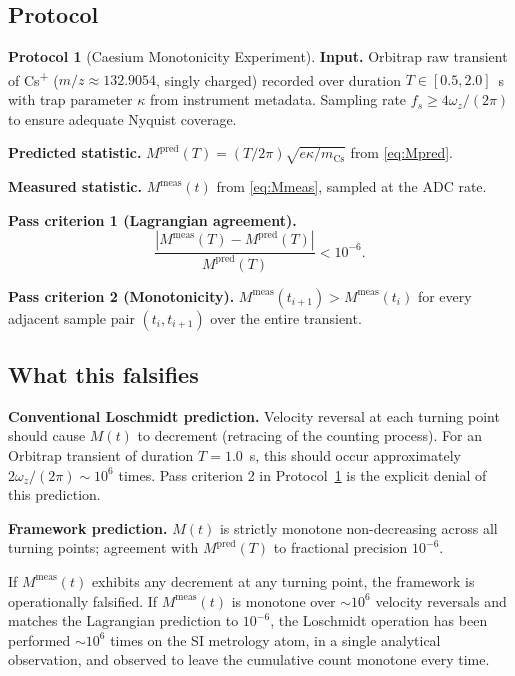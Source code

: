 \documentclass[twocolumn,10pt,a4paper]{article}
\theoremstyle{thmstyle}
\theoremstyle{definition}
\newtheorem{protocol}[theorem]{Protocol}
\theoremstyle{remark}
\begin{document}
\subsection{Protocol}

\begin{protocol}[Caesium Monotonicity Experiment]
\label{prot:C1}
\textbf{Input.} Orbitrap raw transient of Cs\textsuperscript{+}
($m/z\approx 132.9054$, singly charged) recorded over duration
$T\in[0.5,2.0]$~s with trap parameter $\kappa$ from instrument
metadata. Sampling rate $f_{s}\geq 4\omega_{z}/(2\pi)$ to ensure
adequate Nyquist coverage.

\textbf{Predicted statistic.}
$M^{\mathrm{pred}}(T)=(T/2\pi)\sqrt{e\kappa/m_{\mathrm{Cs}}}$ from
\eqref{eq:Mpred}.

\textbf{Measured statistic.} $M^{\mathrm{meas}}(t)$ from
\eqref{eq:Mmeas}, sampled at the ADC rate.

\textbf{Pass criterion 1 (Lagrangian agreement).}
\[
\frac{|M^{\mathrm{meas}}(T)-M^{\mathrm{pred}}(T)|}{M^{\mathrm{pred}}(T)}<10^{-6}.
\]

\textbf{Pass criterion 2 (Monotonicity).}
$M^{\mathrm{meas}}(t_{i+1})>M^{\mathrm{meas}}(t_{i})$ for every
adjacent sample pair $(t_{i},t_{i+1})$ over the entire transient.
\end{protocol}

\subsection{What this falsifies}

\textbf{Conventional Loschmidt prediction.} Velocity reversal at each
turning point should cause $M(t)$ to decrement (retracing of the
counting process). For an Orbitrap transient of duration
$T=1.0$~s, this should occur approximately
$2\omega_{z}/(2\pi)\sim 10^{6}$ times. Pass criterion 2 in
Protocol~\ref{prot:C1} is the explicit denial of this prediction.

\textbf{Framework prediction.} $M(t)$ is strictly monotone
non-decreasing across all turning points; agreement with
$M^{\mathrm{pred}}(T)$ to fractional precision $10^{-6}$.

If $M^{\mathrm{meas}}(t)$ exhibits any decrement at any turning point,
the framework is operationally falsified. If $M^{\mathrm{meas}}(t)$ is
monotone over $\sim 10^{6}$ velocity reversals and matches the
Lagrangian prediction to $10^{-6}$, the Loschmidt operation has been
performed $\sim 10^{6}$ times on the SI metrology atom, in a single
analytical observation, and observed to leave the cumulative count
monotone every time.
\end{document}
